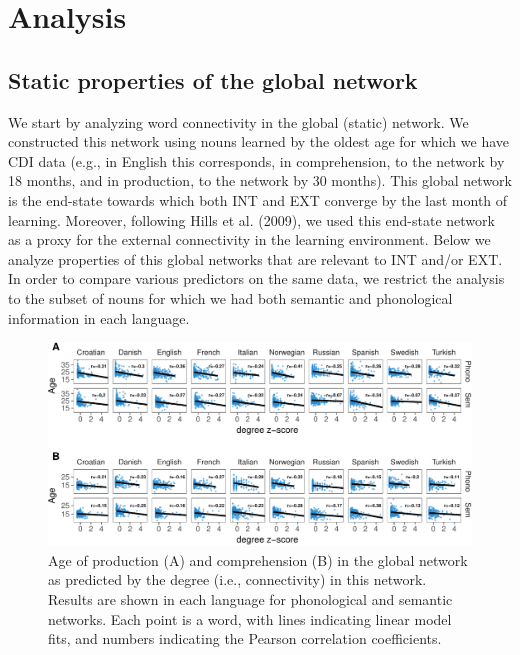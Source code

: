 \documentclass[english,floatsintext,man]{apa6}
\theoremstyle{definition}
\theoremstyle{definition}
\theoremstyle{definition}
\theoremstyle{remark}
\begin{document}
\section{Analysis}\label{analysis}

\subsection{Static properties of the global
network}\label{static-properties-of-the-global-network}

We start by analyzing word connectivity in the global (static) network.
We constructed this network using nouns learned by the oldest age for
which we have CDI data (e.g., in English this corresponds, in
comprehension, to the network by 18 months, and in production, to the
network by 30 months). This global network is the end-state towards
which both INT and EXT converge by the last month of learning. Moreover,
following Hills et al. (2009), we used this end-state network as a proxy
for the external connectivity in the learning environment. Below we
analyze properties of this global networks that are relevant to INT
and/or EXT. In order to compare various predictors on the same data, we
restrict the analysis to the subset of nouns for which we had both
semantic and phonological information in each language.

\begin{figure}[!h]
\includegraphics[width=\textwidth]{ms_files/figure-latex/corrAll-1} \caption{Age of production (A) and comprehension (B) in the global network as predicted by the degree (i.e., connectivity) in this network. Results are shown in each language for phonological and semantic networks. Each point is a word, with lines indicating linear model fits, and numbers indicating the Pearson correlation coefficients.}\label{fig:corrAll}
\end{figure}
\end{document}
